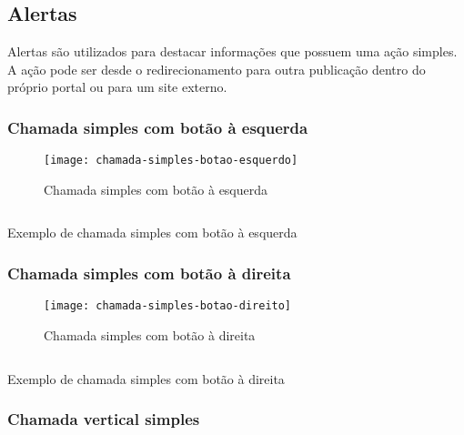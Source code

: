 \subsection{Alertas}

Alertas são utilizados para destacar informações que possuem uma ação simples. A ação pode ser desde o redirecionamento para outra publicação dentro do próprio portal ou para um site externo.


\subsubsection{Chamada simples com botão à esquerda}

\begin{figure}[!ht]
    \centering
    \texttt{[image: chamada-simples-botao-esquerdo]}
    \caption{Chamada simples com botão à esquerda}\label{RS0001:fig:chamada-simples-botao-esquerdo}
\end{figure}

\begin{code}
    \inputminted[label=chamada-simples-botao-esquerdo.html]{html}{../RS0001/anexos/chamada-simples-botao-esquerdo.html}
    \caption{Exemplo de chamada simples com botão à esquerda}\label{RS0001:code:exemplo-chamada-simples-botao-esquerdo}
\end{code}


\subsubsection{Chamada simples com botão à direita}

\begin{figure}[!ht]
    \centering
    \texttt{[image: chamada-simples-botao-direito]}
    \caption{Chamada simples com botão à direita}\label{RS0001:fig:chamada-simples-botao-direito}
\end{figure}

\begin{code}
    \inputminted[label=chamada-simples-botao-direito.html]{html}{../RS0001/anexos/chamada-simples-botao-direito.html}
    \caption{Exemplo de chamada simples com botão à direita}\label{RS0001:code:exemplo-chamada-simples-botao-direito}
\end{code}


\subsubsection{Chamada vertical simples}

